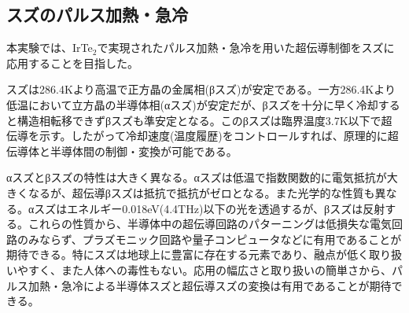 \subsection{スズのパルス加熱・急冷}
本実験では、IrTe$_2$で実現されたパルス加熱・急冷を用いた超伝導制御をスズに応用することを目指した。

スズは286.4Kより高温で正方晶の金属相(βスズ)が安定である。一方286.4Kより低温において立方晶の半導体相(αスズ)が安定だが、βスズを十分に早く冷却すると構造相転移できずβスズも準安定となる。このβスズは臨界温度3.7K以下で超伝導を示す。したがって冷却速度(温度履歴)をコントロールすれば、原理的に超伝導体と半導体間の制御・変換が可能である。

αスズとβスズの特性は大きく異なる。αスズは低温で指数関数的に電気抵抗が大きくなるが、超伝導βスズは抵抗で抵抗がゼロとなる。また光学的な性質も異なる。αスズはエネルギー0.018eV(4.4THz)以下の光を透過するが、βスズは反射する。これらの性質から、半導体中の超伝導回路のパターニングは低損失な電気回路のみならず、プラズモニック回路や量子コンピュータなどに有用であることが期待できる。特にスズは地球上に豊富に存在する元素であり、融点が低く取り扱いやすく、また人体への毒性もない。応用の幅広さと取り扱いの簡単さから、パルス加熱・急冷による半導体スズと超伝導スズの変換は有用であることが期待できる。


